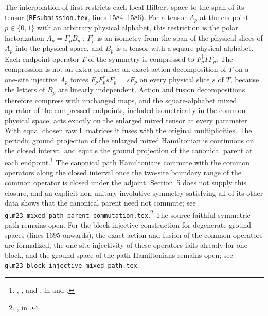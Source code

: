 \documentclass{article}
\begin{document}
The interpolation of \cite[Section~5]{GarreRubio2023MPOSym} first restricts
each local Hilbert space to the span of its tensor
(\texttt{REsubmission.tex}, lines 1584--1586). For a tensor $A_p$ at the
endpoint $p\in\{0,1\}$ with an arbitrary physical alphabet, this restriction
is the polar factorization $A_p=F_pB_p$ \cite{Malz2024Preparation}: $F_p$ is
an isometry from the span of the physical slices of $A_p$ into the physical
space, and $B_p$ is a tensor with a square physical alphabet. Each endpoint
operator $T$ of the symmetry is compressed to $F_p^\dagger T F_p$. The compression is not an extra premise: an exact action
decomposition of $T$ on a one-site injective $A_p$ forces
$F_pF_p^\dagger sF_p=sF_p$ on every physical slice $s$ of $T$, because the
letters of $B_p$ are linearly independent. Action and fusion decompositions
therefore compress with unchanged maps, and the square-alphabet mixed operator
of the compressed endpoints, included isometrically in the common physical
space, acts exactly on the enlarged mixed tensor at every parameter. With
equal chosen raw L matrices it fuses with the original multiplicities. The
periodic ground projection of the enlarged mixed Hamiltonian is continuous on
the closed interval and equals the ground projection of the canonical parent
at each endpoint.\footnote{,
    ,
    and
    ,
    in  and
    .}
The canonical path Hamiltonians commute with the common operators along
the closed interval once the two-site boundary range of the common
operator is closed under the adjoint. Section~5 does not supply this
closure, and an explicit non-unitary involutive symmetry satisfying all
of its other data shows that the canonical parent need not commute; see
\texttt{glm23\_mixed\_path\_parent\_commutation.tex}.\footnote{,
    in .}
The source-faithful symmetric path remains open. For the block-injective
construction for degenerate ground spaces (lines 1695 onwards), the exact
action and fusion of the common operators are formalized, the one-site
injectivity of these operators fails already for one block, and the
ground space of the path Hamiltonians remains open; see
\texttt{glm23\_block\_injective\_mixed\_path.tex}.
\end{document}
